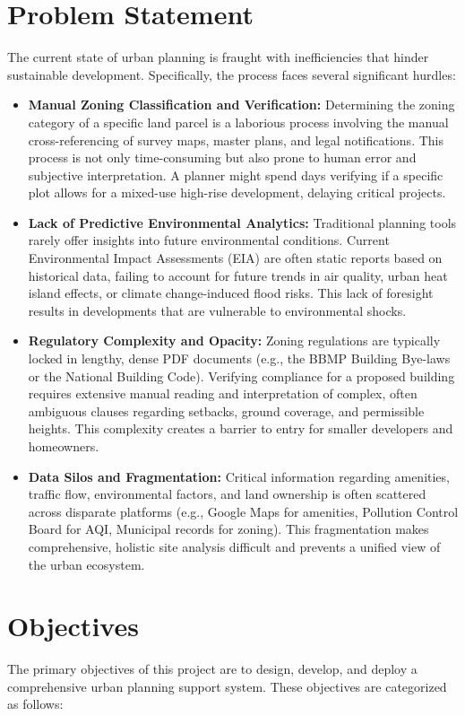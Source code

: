 \documentclass[12pt,a4paper]{report}
\begin{document}
\section{Problem Statement}
The current state of urban planning is fraught with inefficiencies that hinder sustainable development. Specifically, the process faces several significant hurdles:
\begin{itemize}
    \item \textbf{Manual Zoning Classification and Verification:} Determining the zoning category of a specific land parcel is a laborious process involving the manual cross-referencing of survey maps, master plans, and legal notifications. This process is not only time-consuming but also prone to human error and subjective interpretation. A planner might spend days verifying if a specific plot allows for a mixed-use high-rise development, delaying critical projects.
    \item \textbf{Lack of Predictive Environmental Analytics:} Traditional planning tools rarely offer insights into future environmental conditions. Current Environmental Impact Assessments (EIA) are often static reports based on historical data, failing to account for future trends in air quality, urban heat island effects, or climate change-induced flood risks. This lack of foresight results in developments that are vulnerable to environmental shocks.
    \item \textbf{Regulatory Complexity and Opacity:} Zoning regulations are typically locked in lengthy, dense PDF documents (e.g., the BBMP Building Bye-laws or the National Building Code). Verifying compliance for a proposed building requires extensive manual reading and interpretation of complex, often ambiguous clauses regarding setbacks, ground coverage, and permissible heights. This complexity creates a barrier to entry for smaller developers and homeowners.
    \item \textbf{Data Silos and Fragmentation:} Critical information regarding amenities, traffic flow, environmental factors, and land ownership is often scattered across disparate platforms (e.g., Google Maps for amenities, Pollution Control Board for AQI, Municipal records for zoning). This fragmentation makes comprehensive, holistic site analysis difficult and prevents a unified view of the urban ecosystem.
\end{itemize}

\section{Objectives}
The primary objectives of this project are to design, develop, and deploy a comprehensive urban planning support system. These objectives are categorized as follows:
\end{document}
